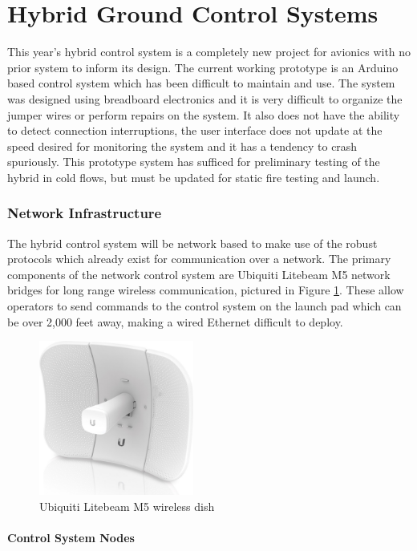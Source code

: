 \part{Hybrid Ground Control Systems}

This year's hybrid control system is a completely new project for avionics with no prior system to inform its design.
The current working prototype is an Arduino based control system which has been difficult to maintain and use. The
system was designed using breadboard electronics and it is very difficult to organize the jumper wires or perform
repairs on the system. It also does not have the ability to detect connection interruptions, the user interface does
not update at the speed desired for monitoring the system and it has a tendency to crash spuriously. This prototype
system has sufficed for preliminary testing of the hybrid in cold flows, but must be updated for static fire testing
and launch.

\section{Network Infrastructure}

The hybrid control system will be network based to make use of the robust protocols which already exist for
communication over a network. The primary components of the network control system are Ubiquiti Litebeam M5 network bridges for
long range wireless communication, pictured in Figure \ref{fig:ubiquiti-dish}. These allow operators to send commands to the
control system on the launch pad which can be over 2,000 feet away, making a wired Ethernet difficult to deploy.


\begin{figure}[H]
    \center
    \includegraphics[width=2in]{assets/images/ubiquiti-dish.jpg}
    \caption{Ubiquiti Litebeam M5 wireless dish \cite{ubiquiti-dish}}
    \label{fig:ubiquiti-dish}
\end{figure}

\subsection{Control System Nodes}

